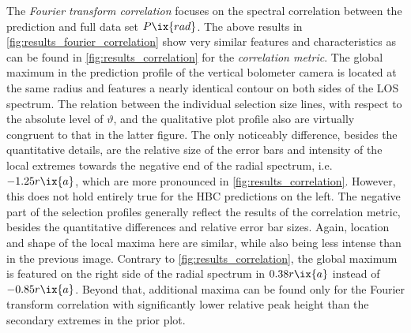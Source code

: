             The \textit{Fourier transform correlation} focuses on the spectral correlation between the prediction and full data set $P\ix{rad}$. The above results in \cref{fig:results_fourier_correlation} show very similar features and characteristics as can be found in \cref{fig:results_correlation} for the \textit{correlation metric}. The global maximum in the prediction profile of the vertical bolometer camera is located at the same radius and features a nearly identical contour on both sides of the LOS spectrum. The relation between the individual selection size lines, with respect to the absolute level of $\vartheta$, and the qualitative plot profile also are virtually congruent to that in the latter figure. The only noticeably difference, besides the quantitative details, are the relative size of the error bars and intensity of the local extremes towards the negative end of the radial spectrum, i.e. $-1.25r\ix{a}$, which are more pronounced in \cref{fig:results_correlation}. However, this does not hold entirely true for the HBC predictions on the left. The negative part of the selection profiles generally reflect the results of the correlation metric, besides the quantitative differences and relative error bar sizes. Again, location and shape of the local maxima here are similar, while also being less intense than in the previous image. Contrary to \cref{fig:results_correlation}, the global maximum is featured on the right side of the radial spectrum in $0.38r\ix{a}$ instead of $-0.85r\ix{a}$. Beyond that, additional maxima can be found only for the Fourier transform correlation with significantly lower relative peak height than the secondary extremes in the prior plot.\\%
